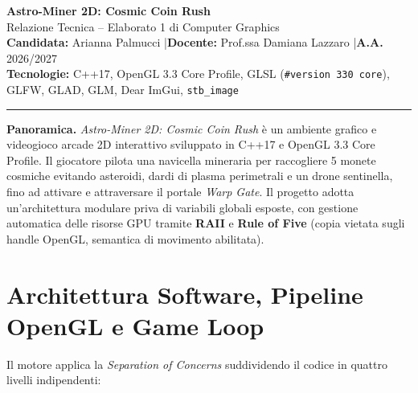 \documentclass[11pt,a4paper]{article}
\begin{document}
\begin{center}
    {\LARGE\bfseries\color{darkSlate} Astro-Miner 2D: Cosmic Coin Rush}\\[5pt]
    {\normalsize\color{accentBlue} Relazione Tecnica -- Elaborato 1 di Computer Graphics}\\[8pt]
    {\small\textbf{Candidata:} Arianna Palmucci \quad|\quad \textbf{Docente:} Prof.ssa Damiana Lazzaro \quad|\quad \textbf{A.A.} 2026/2027}\\
    {\small\textbf{Tecnologie:} C++17, OpenGL 3.3 Core Profile, GLSL (\texttt{\#version 330 core}), GLFW, GLAD, GLM, Dear ImGui, \texttt{stb\_image}}
\end{center}
\vspace{4pt}
\hrule
\vspace{10pt}

\noindent\textbf{Panoramica.} \textit{Astro-Miner 2D: Cosmic Coin Rush} è un ambiente grafico e videogioco arcade 2D interattivo sviluppato in C++17 e OpenGL 3.3 Core Profile. Il giocatore pilota una navicella mineraria per raccogliere 5 monete cosmiche evitando asteroidi, dardi di plasma perimetrali e un drone sentinella, fino ad attivare e attraversare il portale \textit{Warp Gate}. Il progetto adotta un'architettura modulare priva di variabili globali esposte, con gestione automatica delle risorse GPU tramite \textbf{RAII} e \textbf{Rule of Five} (copia vietata sugli handle OpenGL, semantica di movimento abilitata).

\section{Architettura Software, Pipeline OpenGL e Game Loop}
Il motore applica la \textit{Separation of Concerns} suddividendo il codice in quattro livelli indipendenti:
\end{document}
